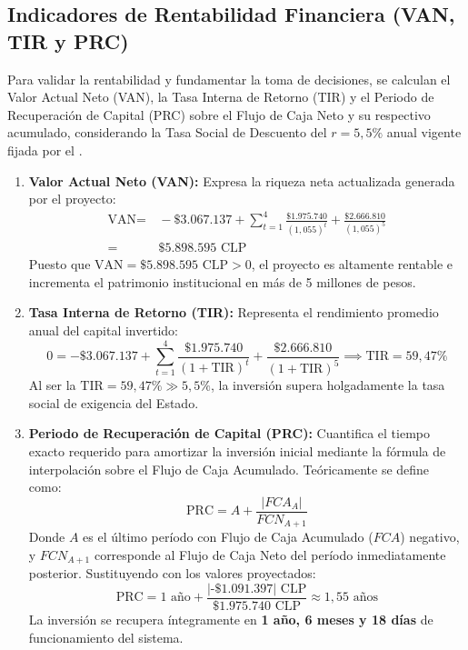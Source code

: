 \subsection{Indicadores de Rentabilidad Financiera (VAN, TIR y PRC)}

Para validar la rentabilidad y fundamentar la toma de decisiones, se calculan el Valor Actual Neto (VAN), la Tasa Interna de Retorno (TIR) y el Periodo de Recuperación de Capital (PRC) sobre el Flujo de Caja Neto y su respectivo acumulado, considerando la Tasa Social de Descuento del $r = 5{,}5\%$ anual vigente fijada por el \textcite{MinisterioDesarrolloSocial}.

\begin{enumerate}
    \item \textbf{Valor Actual Neto (VAN):} Expresa la riqueza neta actualizada generada por el proyecto:
    \begin{align}
        \text{VAN} = & \, -\$3.067.137 + \sum_{t=1}^{4} \frac{\$1.975.740}{(1{,}055)^t} + \frac{\$2.666.810}{(1{,}055)^5} \nonumber \\
        = & \, \$5.898.595 \text{ CLP}
    \end{align}
    Puesto que $\text{VAN} = \$5.898.595 \text{ CLP} > 0$, el proyecto es altamente rentable e incrementa el patrimonio institucional en más de 5 millones de pesos.
    
    \item \textbf{Tasa Interna de Retorno (TIR):} Representa el rendimiento promedio anual del capital invertido:
    \begin{equation}
        0 = -\$3.067.137 + \sum_{t=1}^{4} \frac{\$1.975.740}{(1+\text{TIR})^t} + \frac{\$2.666.810}{(1+\text{TIR})^5} \implies \text{TIR} = 59{,}47\%
    \end{equation}
    Al ser la $\text{TIR} = 59{,}47\% \gg 5{,}5\%$, la inversión supera holgadamente la tasa social de exigencia del Estado.
    
    \item \textbf{Periodo de Recuperación de Capital (PRC):} Cuantifica el tiempo exacto requerido para amortizar la inversión inicial mediante la fórmula de interpolación sobre el Flujo de Caja Acumulado. Teóricamente se define como:
    \begin{equation}
        \text{PRC} = A + \frac{|FCA_{A}|}{FCN_{A+1}}
    \end{equation}
    Donde $A$ es el último período con Flujo de Caja Acumulado ($FCA$) negativo, y $FCN_{A+1}$ corresponde al Flujo de Caja Neto del período inmediatamente posterior. Sustituyendo con los valores proyectados:
    \begin{equation}
        \text{PRC} = 1 \text{ año} + \frac{|\text{-\$1.091.397}| \text{ CLP}}{\$1.975.740 \text{ CLP}} \approx 1{,}55 \text{ años}
    \end{equation}
    La inversión se recupera íntegramente en \textbf{1 año, 6 meses y 18 días} de funcionamiento del sistema.
\end{enumerate}

